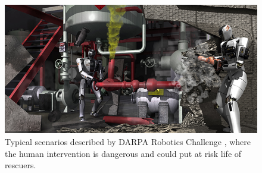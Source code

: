 \begin{figure}
  \centering
  \includegraphics[width=\textwidth]{figures/DARPARoboticsChallenge.jpg}
  \caption{Typical scenarios described by DARPA Robotics Challenge
      \cite{Atkenson2018DARPARoboticsChallengeFinals}, where the human 
      intervention is dangerous and could put at risk life of rescuers.}
  \label{fig:drc}
\end{figure}

